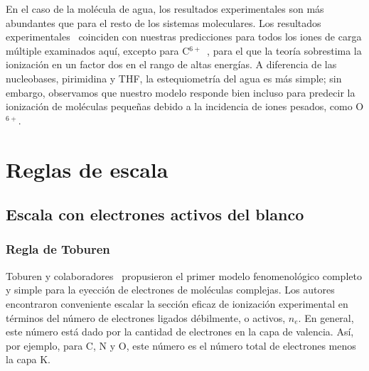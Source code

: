 En el caso de la molécula de agua, los resultados experimentales son más 
abundantes que para el resto de los sistemas moleculares. Los resultados 
experimentales~\cite{Luna2007,Bolorizadeh86,H_Rudd85,Ohsawa05,
He_Rudd85,toburen80,Bhattacharjee:16} coinciden con 
nuestras predicciones para todos los iones de carga múltiple examinados 
aquí, excepto para C$^{6+}$~\cite{DalCappello:09,Bhattacharjee:17}, para 
el que la teoría sobrestima la ionización en un factor dos en el rango de 
altas energías. A diferencia de las nucleobases, pirimidina y THF, la 
estequiometría del agua es más simple; sin embargo, observamos que 
nuestro modelo responde bien incluso para predecir la ionización de 
moléculas pequeñas debido a la incidencia de iones pesados, como 
O$^{6+}$.

\section{Reglas de escala}
\label{sec:scaling}

\subsection{Escala con electrones activos del blanco}
\label{subsec:ne_scaling}

\subsubsection{Regla de Toburen}
\label{subsec:toburen}

Toburen y colaboradores~\cite{Toburen:75,Toburen:76} propusieron el 
primer modelo fenomenológico completo y simple para la eyección de 
electrones de moléculas complejas. Los autores encontraron conveniente 
escalar la sección eficaz de ionización experimental en términos del 
número de electrones ligados débilmente, o activos, $n_e$. En general, 
este número está dado por la cantidad de electrones en la capa de 
valencia. Así, por ejemplo, para C, N y O, este número es el número total 
de electrones menos la capa K. 

